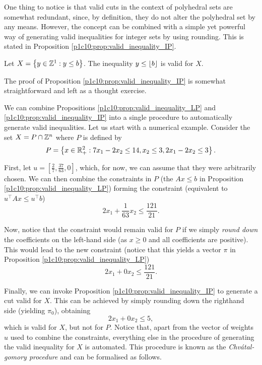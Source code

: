 One thing to notice is that valid cuts in the context of polyhedral sets are somewhat redundant, since, by definition, they do not alter the polyhedral set by any means. However, the concept can be combined with a simple yet powerful way of generating valid inequalities for integer sets by using rounding. This is stated in Proposition \ref{p1c10:prop:valid_inequality_IP}. 
%
\begin{proposition} \label{p1c10:prop:valid_inequality_IP}
	Let $X = \left\{ y \in \mathbb{Z}^1 : y \leq b \right \}$. The inequality $y \leq \lfloor b \rfloor$ is valid for $X$.
\end{proposition}
%
The proof of Proposition \ref{p1c10:prop:valid_inequality_IP} is somewhat straightforward and left as a thought exercise. 

We can combine Propositions \ref{p1c10:prop:valid_inequality_LP} and \ref{p1c10:prop:valid_inequality_IP} into a single procedure to automatically generate valid inequalities. Let us start with a numerical example. Consider the set $X = P \cap \mathbb{Z}^n$ where $P$ is defined by
	\begin{equation*}
		P = \left\{ x \in \mathbb{R}^2_+ : 7x_1 -2x_2 \leq 14, x_2 \leq 3, 2x_1 - 2x_2 \leq 3 \right \}.
	\end{equation*}
	
First, let $u=\left[\frac{2}{7}, \frac{37}{63}, 0\right]$, which, for now, we can assume that they were arbitrarily chosen. We can then combine the constraints in $P$ (the $Ax \le b$ in Proposition \ref{p1c10:prop:valid_inequality_LP}) forming the constraint (equivalent to $u^\top Ax \le u^\top b$)
	\begin{equation*}
		2x_1 + \frac{1}{63}x_2 \leq \frac{121}{21}.
	\end{equation*}
	
Now, notice that the constraint would remain valid for $P$ if we simply \emph{round down} the coefficients on the left-hand side (as $x \ge 0$ and all coefficients are positive). This would lead to the new constraint (notice that this yields a vector $\pi$ in Proposition \ref{p1c10:prop:valid_inequality_LP})
	\begin{equation*}
		2x_1 + 0x_2 \leq \frac{121}{21}.
	\end{equation*}
	
Finally, we can invoke Proposition \ref{p1c10:prop:valid_inequality_IP} to generate a cut valid for $X$. This can be achieved by simply rounding down the righthand side (yielding $\pi_0$), obtaining
	\begin{equation*}
		2x_1 + 0x_2 \leq 5,
	\end{equation*}
	which is valid for $X$, but not for $P$. Notice that, apart from the vector of weights $u$ used to combine the constraints, everything else in the procedure of generating the valid inequality for $X$ is automated. This procedure is known as the \emph{Chv\'atal-gomory procedure} and can be formalised as follows.
	
